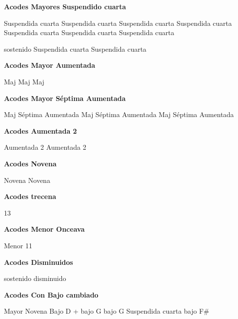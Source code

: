 \vskip 20pt
\textbf{Acodes Mayores Suspendido cuarta}
\vskip 25pt

\small
{} Suspendida cuarta
 Suspendida cuarta
 Suspendida cuarta
 Suspendida cuarta
 Suspendida cuarta
 Suspendida cuarta
 Suspendida cuarta

 sostenido Suspendida cuarta
 Suspendida cuarta
\normalsize

\vskip 20pt
\textbf{Acodes Mayor Aumentada}
\vskip 25pt

\small
{} Maj
 Maj
 Maj
\normalsize

\vskip 20pt
\textbf{Acodes Mayor S\'eptima Aumentada}
\vskip 25pt

\small
{} Maj S\'eptima Aumentada
 Maj S\'eptima Aumentada
 Maj S\'eptima Aumentada
\normalsize

\vskip 20pt
\textbf{Acodes Aumentada 2}
\vskip 25pt

\small
{} Aumentada 2
 Aumentada 2
\normalsize

\vskip 20pt
\textbf{Acodes Novena}
\vskip 25pt

\small
{} Novena
 Novena
\normalsize

\vskip 20pt
\textbf{Acodes trecena}
\vskip 25pt

\small
{} 13
\normalsize

\vskip 20pt
\textbf{Acodes Menor Onceava}
\vskip 25pt

\small
{} Menor 11
\normalsize

\vskip 20pt
\textbf{Acodes Disminuidos}
\vskip 25pt

\small
{} sostenido disminuido
\normalsize


\vskip 20pt
\textbf{Acodes Con Bajo cambiado}

\small
{}
\vskip 20pt
\vskip 20pt
\vskip 20pt
\vskip 20pt
\vskip 20pt
\vskip 20pt
 Mayor Novena Bajo D
 + bajo G
\vskip 20pt
 bajo G
 Suspendida cuarta bajo F\#
\normalsize

